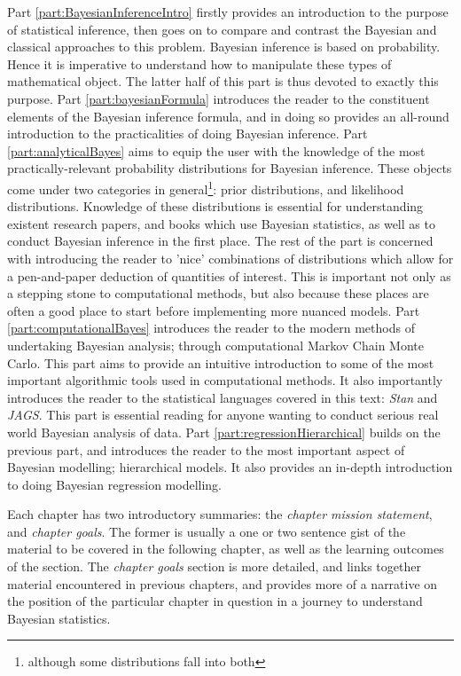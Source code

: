 \documentclass[11pt,fullpage]{book}
\begin{document}
Part \ref{part:BayesianInferenceIntro} firstly provides an introduction to the purpose of statistical inference, then goes on to compare and contrast the Bayesian and classical approaches to this problem. Bayesian inference is based on probability. Hence it is imperative to understand how to manipulate these types of mathematical object. The latter half of this part is thus devoted to exactly this purpose. Part \ref{part:bayesianFormula} introduces the reader to the constituent elements of the Bayesian inference formula, and in doing so provides an all-round introduction to the practicalities of doing Bayesian inference. Part \ref{part:analyticalBayes} aims to equip the user with the knowledge of the most practically-relevant probability distributions for Bayesian inference. These objects come under two categories in general\footnote{although some distributions fall into both}: prior distributions, and likelihood distributions. Knowledge of these distributions is essential for understanding existent research papers, and books which use Bayesian statistics, as well as to conduct Bayesian inference in the first place. The rest of the part is concerned with introducing the reader to 'nice' combinations of distributions which allow for a pen-and-paper deduction of quantities of interest. This is important not only as a stepping stone to computational methods, but also because these places are often a good place to start before implementing more nuanced models. Part \ref{part:computationalBayes} introduces the reader to the modern methods of undertaking Bayesian analysis; through computational Markov Chain Monte Carlo. This part aims to provide an intuitive introduction to some of the most important algorithmic tools used in computational methods. It also importantly introduces the reader to the statistical languages covered in this text: \textit{Stan} and \textit{JAGS}. This part is essential reading for anyone wanting to conduct serious real world Bayesian analysis of data. Part \ref{part:regressionHierarchical} builds on the previous part, and introduces the reader to the most important aspect of Bayesian modelling; hierarchical models. It also provides an in-depth introduction to doing Bayesian regression modelling.

Each chapter has two introductory summaries: the \textit{chapter mission statement}, and \textit{chapter goals}. The former is usually a one or two sentence gist of the material to be covered in the following chapter, as well as the learning outcomes of the section. The \textit{chapter goals} section is more detailed, and links together material encountered in previous chapters, and provides more of a narrative on the position of the particular chapter in question in a journey to understand Bayesian statistics. 
\end{document}
